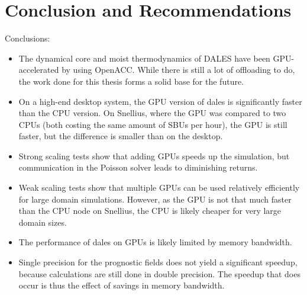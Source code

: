 \chapter{Conclusion and Recommendations} \label{chap:conclusion_rec}
Conclusions:
\begin{itemize}
    \item The dynamical core and moist thermodynamics of DALES have been GPU-accelerated by using OpenACC. While there is still a lot of offloading to do, the work done for this thesis forms a solid base for the future.
    \item On a high-end desktop system, the GPU version of dales is significantly faster than the CPU version. On Snellius, where the GPU was compared to two CPUs (both costing the same amount of SBUs per hour), the GPU is still faster, but the difference is smaller than on the desktop. 
    \item Strong scaling tests show that adding GPUs speeds up the simulation, but communication in the Poisson solver leads to diminishing returns.
    \item Weak scaling tests show that multiple GPUs can be used relatively efficiently for large domain simulations. However, as the GPU is not that much faster than the CPU node on Snellius, the CPU is likely cheaper for very large domain sizes.
    \item The performance of \acrshort{dales} on GPUs is likely limited by memory bandwidth. 
    \item Single precision for the prognostic fields does not yield a significant speedup, because calculations are still done in double precision. The speedup that does occur is thus the effect of savings in memory bandwidth.
\end{itemize}

